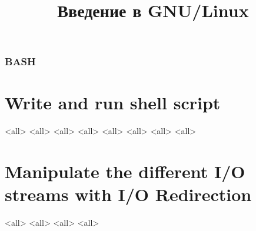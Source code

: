 
\title{Введение в GNU/Linux}




\begin{frame}
	\frametitle{BASH}
	\titlepage
	\vspace{-0.5cm}
	\begin{center}
	\end{center}
\end{frame}

\begin{frame}
	\tableofcontents
\end{frame}





\section{Write and run shell script}
\mode<all>{}
\mode<all>{}
\mode<all>{}
\mode<all>{}
\mode<all>{}
\mode<all>{}
\mode<all>{}
\mode<all>{}

\section{Manipulate the different I/O streams  with I/O Redirection}
\mode<all>{}
\mode<all>{}
\mode<all>{}
\mode<all>{}



